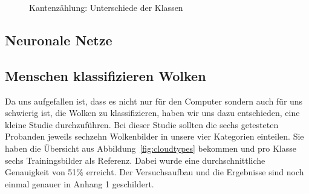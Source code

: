 \documentclass[a4,german]{article}
\begin{document}
\begin{figure}[h!]%
\caption{Kantenzählung: Unterschiede der Klassen}
    \label{fig:kbs}
\end{figure}

\subsection{Neuronale Netze}


\subsection{Menschen klassifizieren Wolken}

Da uns aufgefallen ist, dass es nicht nur für den Computer sondern auch für uns schwierig ist, die Wolken zu klassifizieren, haben wir uns dazu entschieden, eine kleine Studie durchzuführen.
Bei dieser Studie sollten die sechs getesteten Probanden jeweils sechzehn Wolkenbilder in unsere vier Kategorien einteilen.
Sie haben die Übersicht aus Abbildung~\ref{fig:cloudtypes} bekommen und pro Klasse sechs Trainingsbilder als Referenz.
Dabei wurde eine durchschnittliche Genauigkeit von 51\% erreicht. Der Versuchsaufbau und die Ergebnisse sind noch einmal genauer in Anhang 1 %
geschildert.
\end{document}
